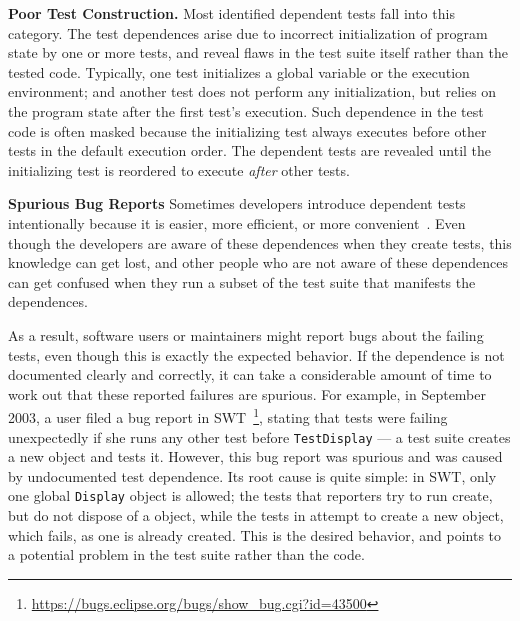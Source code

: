 \noindent \textbf{Poor Test Construction.} Most identified
dependent tests fall into this category. The test dependences
arise due to incorrect initialization of program state by one
or more tests, and reveal flaws in the test suite itself
rather than the tested code. Typically, one test initializes
a global variable or the execution environment; and another
test does not perform any initialization, but
relies on the program state after the first test's execution.
Such dependence in the test code is often masked because
the initializing test always executes before other tests in the
default execution order. The dependent tests are revealed
until the initializing test is reordered to execute
\textit{after} other tests. 


\vspace{1mm}

\noindent \textbf{Spurious Bug Reports}
Sometimes developers introduce dependent tests intentionally because it is
easier, more efficient, or more convenient~\cite{kapfhammeretal:FSE:2003, whittakeretal:2012}.
Even though the developers are aware of these dependences
when they create tests, this knowledge can get lost, 
and other people who are not aware of these dependences can get confused 
when they run a subset of the test suite that manifests the
dependences.

As a result, software users or maintainers
might report bugs about the failing tests, even though this
is exactly the expected behavior. 
If the dependence is not documented clearly and
correctly, it can take a considerable amount of time to work out that
these reported failures are spurious.
For example,
in September 2003, a user filed a
bug report in SWT~\cite{swt}\footnote{\url{https://bugs.eclipse.org/bugs/show_bug.cgi?id=43500}},
stating that tests were failing unexpectedly
if she runs any other test before \texttt{TestDisplay} --- 
a test suite creates a new  object and tests it.
However, this bug report was spurious and was
caused by undocumented test dependence.
Its root cause is quite simple: in SWT, only one global \texttt{Display}
object is allowed; the tests that reporters try to run
create, but do not dispose of a  object, while
the tests in  attempt to create
a new  object, which fails, as one
is already created. This is the desired behavior,
and points to a potential problem in the test suite rather
than the code.


